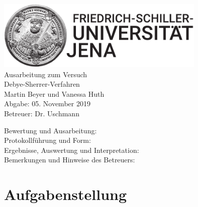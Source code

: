 \documentclass[a4paper,twoside,final]{article}
\begin{document}
\setlength{\marginparsep}{2em}
\renewcommand{\theequation}{\arabic{section}.\arabic{equation}}
\renewcommand{\thefigure}{\arabic{section}.\arabic{figure}}
\renewcommand{\thetable}{\arabic{section}.\arabic{table}}

\begin{center}
\thispagestyle{empty}
  \includegraphics[width=0.75\textwidth]{UniJena_BildWortMarke_black.pdf}\\[4em]
  \Large
  Ausarbeitung zum Versuch\\[2em]
  \Huge
  Debye-Sherrer-Verfahren\\
  \vspace{2cm}
  \Large
  Martin Beyer und Vanessa Huth\\[2em]
  Abgabe: 05. November 2019\\[2em]
  Betreuer: Dr. Uschmann\\[5em]
  \begin{flushleft}
  	Bewertung und Ausarbeitung:\\[2em]
		Protokollführung und Form:\\[1em]
		Ergebnisse, Auswertung und Interpretation:\\[1em]
		Bemerkungen und Hinweise des Betreuers:
  \end{flushleft}
\end{center}
\clearpage

\pagestyle{fancy}
\renewcommand{\headrulewidth}{0pt}
\renewcommand{\footrulewidth}{0.5pt}
\renewcommand{\sectionmark}[1]{\markright{#1}}
\fancyhead[RE,LO]{\rightmark}
\fancyfoot[LE,RO]{\bfseries\thepage}
\renewcommand{\headrulewidth}{0.5pt}
\renewcommand{\footrulewidth}{0.5pt}

\setcounter{equation}{0}
\setcounter{figure}{0}


\section{Aufgabenstellung} \label{sec:Aufgabenstellung}
\end{document}

